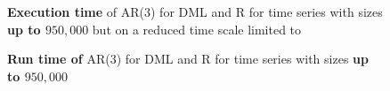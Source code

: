 \begin{figure}[ht]
	\centering
	\caption{\textbf{Execution time} of AR(3) for DML and R for time series with sizes \textbf{up to $950,000$} but on a reduced time scale limited to}
    \label{apx-fig:ar3-exectime-scatter-all}
\end{figure}

\begin{figure}[ht]
	\centering
	\caption{\textbf{Run time of} AR(3) for DML and R for time series with sizes \textbf{up to $950,000$} }
    \label{apx-fig:ar3-runtime-scatter-all}
\end{figure}

